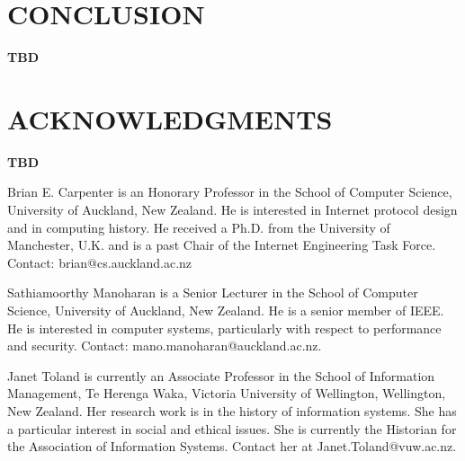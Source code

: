 \documentclass{IEEEcsmag}
\begin{document}
\vspace*{-8pt}
\section{CONCLUSION}

{\bf TBD}

\vspace*{-8pt}
\section{ACKNOWLEDGMENTS}

{\bf TBD}




\begin{IEEEbiography}{Brian E. Carpenter} is an Honorary Professor in the School of Computer Science, University of Auckland, New Zealand. He is interested in Internet protocol design and in computing history. He received a Ph.D. from the University of Manchester, U.K. and is a past Chair of the Internet Engineering Task Force. Contact: brian@cs.auckland.ac.nz\vspace*{8pt}
\end{IEEEbiography}

\begin{IEEEbiography}{Sathiamoorthy Manoharan} is a Senior Lecturer in the School of Computer Science, University of Auckland, New Zealand.
He is a senior member of IEEE. He is interested in computer systems, particularly with respect to performance and security. Contact: mano.manoharan@auckland.ac.nz.\vspace*{8pt}
\end{IEEEbiography}

\begin{IEEEbiography}{Janet Toland} is currently an Associate Professor in the
School of Information Management, Te Herenga Waka, Victoria
University of Wellington, Wellington, New Zealand. Her
research work is in the history of information systems. She
has a particular interest in social and ethical issues. She is
currently the Historian for the Association of Information
Systems. Contact her at Janet.Toland@vuw.ac.nz.\vspace*{8pt}
\end{IEEEbiography}
\end{document}
